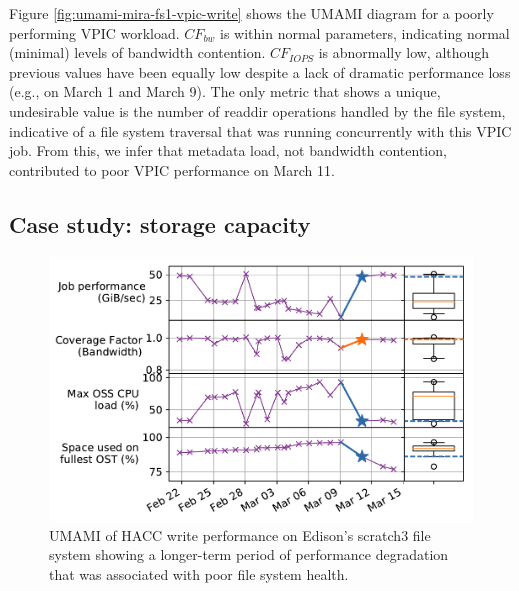 {Figure \ref{fig:umami-mira-fs1-vpic-write} shows the UMAMI diagram for a poorly performing VPIC workload.
$\mathit{CF}_{\mathit{bw}}$ is within normal parameters, indicating normal (minimal) levels of bandwidth contention.
$\mathit{CF}_{\mathit{IOPS}}$ is abnormally low, although previous values have been equally low despite a lack of dramatic performance loss (e.g., on March 1 and March 9).
The only metric that shows a unique, undesirable value is the number of readdir operations handled by the file system, indicative of a file system traversal that was running concurrently with this VPIC job.   From this, we infer that metadata load, not bandwidth contention, contributed to poor VPIC performance on March 11.

\subsection{Case study: storage capacity}

\begin{figure}[t]
    \centering
    \includegraphics[width=1.0\columnwidth]{figs/umami-scratch3-hacc-write-long-term.pdf}
    \vspace{-.25in}
    \caption{UMAMI of HACC write performance on Edison's scratch3 file system showing a longer-term period of performance degradation that was associated with poor file system health.
    }
    \label{fig:umami-scratch3-hacc-write-long-term}
	\vspace{-.15in}
\end{figure}

}
